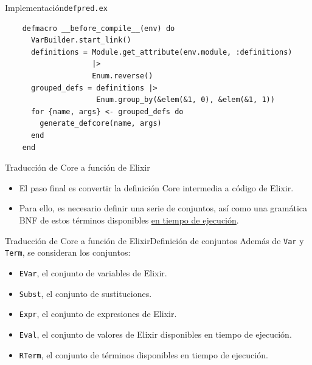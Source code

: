 \documentclass[14pt,aspectratio=169]{beamer}
\begin{document}
\begin{frame}[fragile]{Implementación}{\texttt{defpred.ex}}
  \footnotesize \begin{verbatim}
    defmacro __before_compile__(env) do
      VarBuilder.start_link()
      definitions = Module.get_attribute(env.module, :definitions)
                    |>
                    Enum.reverse()
      grouped_defs = definitions |>
                     Enum.group_by(&elem(&1, 0), &elem(&1, 1))
      for {name, args} <- grouped_defs do
        generate_defcore(name, args)
      end
    end
  \end{verbatim}
\end{frame}

\begin{frame}{Traducción de Core a función de Elixir}
  \begin{itemize}
    \item El paso final es convertir la definición Core intermedia a código de Elixir.
    \item Para ello, es necesario definir una serie de conjuntos, así como una
    gramática BNF de estos términos disponibles \underline{en tiempo de ejecución}.
  \end{itemize}
\end{frame}

\begin{frame}{Traducción de Core a función de Elixir}{Definición de conjuntos}
  Además de \texttt{Var} y \texttt{Term}, se consideran los conjuntos:
  \begin{itemize}
    \item \texttt{EVar}, el conjunto de variables de Elixir.
    \item \texttt{Subst}, el conjunto de sustituciones.
    \item \texttt{Expr}, el conjunto de expresiones de Elixir.
    \item \texttt{Eval}, el conjunto de valores de Elixir disponibles en
    tiempo de ejecución.
    \item \texttt{RTerm}, el conjunto de términos disponibles en tiempo
    de ejecución.
  \end{itemize}
\end{frame}
\end{document}
